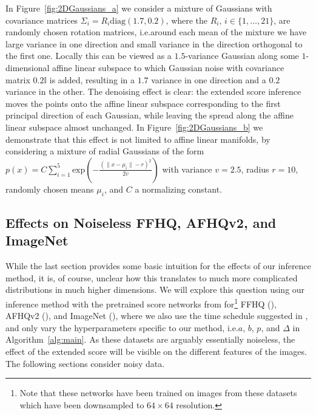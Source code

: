 \documentclass{article}
\theoremstyle{plain}
\theoremstyle{definition}
\theoremstyle{remark}
\begin{document}
  




In Figure~\ref{fig:2DGaussians_a} we consider a mixture of Gaussians with covariance matrices  $\Sigma_i=R_i\mathrm{diag}(1.7,0.2)$, where the $R_i$, $i\in\{1,\dots,21\}$, are randomly chosen rotation matrices, i.e.\@ around each mean of the mixture we have large variance in one direction and small variance in the direction orthogonal to the first one. Locally this can be viewed as a  $1.5$-variance Gaussian along some $1$-dimensional affine linear subspace to which Gaussian noise with covariance matrix $0.2\mathbb{I}$ is added, resulting in a $1.7$ variance in one direction and a $0.2$ variance in the other. The denoising effect is clear: the extended score inference moves the points onto the affine linear subspace corresponding to the first principal direction of each Gaussian, while leaving the spread along the affine linear subspace almost unchanged.
In Figure~\ref{fig:2DGaussians_b} we demonstrate that this effect is not limited to affine linear manifolds, by considering a mixture of radial Gaussians of the form {\small $p(x) = C\sum_{i=1}^5 \mathrm{exp}(-\tfrac{(\|x-\mu_i\|-r)^2}{2v})$} with variance $v=2.5$, radius $r=10$, randomly chosen means $\mu_i$, and $C$ a normalizing constant.


\subsection{Effects on Noiseless FFHQ, AFHQv2, and ImageNet}

\label{sub:ffhq}



While the last section provides some basic intuition for the effects of our inference method, it is, of course, unclear how this translates to much more complicated distributions in much higher dimensions. We will explore this question using our inference method with the pretrained score networks from \cite{edm} for\footnote{Note that these networks have been trained on images from these datasets which have been downsampled to  $64\!\times\! 64$ resolution.} FFHQ (\cite{FFHQ}), AFHQv2 (\cite{AFHQ}), and ImageNet (\cite{ImageNet}), where we also use the time schedule suggested in \cite{edm}, and only vary the hyperparameters specific to our method, i.e.\@ $a$, $b$, $p$, and $\Delta$ in Algorithm~\ref{alg:main}. As these datasets are arguably essentially noiseless, the effect of the extended score will be visible on the different features of the images. The following sections consider noisy data.
\end{document}
